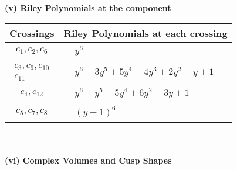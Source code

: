 \documentclass[1p]{elsarticle_modified}
\theoremstyle{definition}
\begin{document}
\newpage\renewcommand{\arraystretch}{1}
\flushleft \textbf{(v) Riley Polynomials at the component}\newline \\
\begin{tabular}{m{50pt}|m{274pt}}
Crossings & \hspace{64pt}Riley Polynomials at each crossing \\
\hline $$\begin{aligned}c_{1},c_{2},c_{6}\end{aligned}$$&$\begin{aligned}
&y^6
\end{aligned}$\\
\hline $$\begin{aligned}c_{3},c_{9},c_{10}\\c_{11}\end{aligned}$$&$\begin{aligned}
&y^6-3 y^5+5 y^4-4 y^3+2 y^2- y+1
\end{aligned}$\\
\hline $$\begin{aligned}c_{4},c_{12}\end{aligned}$$&$\begin{aligned}
&y^6+y^5+5 y^4+6 y^2+3 y+1
\end{aligned}$\\
\hline $$\begin{aligned}c_{5},c_{7},c_{8}\end{aligned}$$&$\begin{aligned}
&(y-1)^6
\end{aligned}$\\
\hline
\end{tabular}\\~\\
\newpage\flushleft \textbf{(vi) Complex Volumes and Cusp Shapes}
\end{document}
